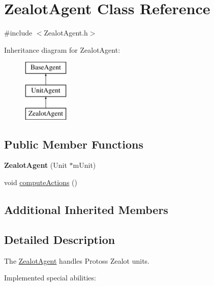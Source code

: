 \hypertarget{class_zealot_agent}{\section{Zealot\-Agent Class Reference}
\label{class_zealot_agent}
}


{\ttfamily \#include $<$Zealot\-Agent.\-h$>$}

Inheritance diagram for Zealot\-Agent\-:\begin{figure}[H]
\begin{center}
\leavevmode
\includegraphics[height=3.000000cm]{class_zealot_agent}
\end{center}
\end{figure}
\subsection*{Public Member Functions}
\begin{DoxyCompactItemize}
\item 
\hypertarget{class_zealot_agent_a30d2f6549737294ce6ff96dd3455fbf8}{{\bfseries Zealot\-Agent} (Unit $\ast$m\-Unit)}\label{class_zealot_agent_a30d2f6549737294ce6ff96dd3455fbf8}

\item 
void \hyperlink{class_zealot_agent_a76b7effe1b4406950f7d7301b0fc6719}{compute\-Actions} ()
\end{DoxyCompactItemize}
\subsection*{Additional Inherited Members}


\subsection{Detailed Description}
The \hyperlink{class_zealot_agent}{Zealot\-Agent} handles Protoss Zealot units.

Implemented special abilities\-:
\begin{DoxyItemize}
\item 
\end{DoxyItemize}


